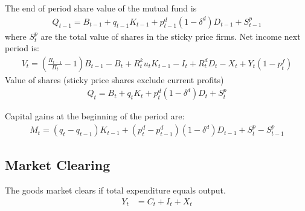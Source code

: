 \documentclass[11pt]{article}
\begin{document}
The end of period share value of the mutual fund is
\begin{align*}
	Q_{t-1} = B_{t-1} + q_{t-1} K_{t-1} + p_{t-1}^d (1 - \delta^d) D_{t-1} + S_{t-1}^p
\end{align*}
where $S_t^p$ are the total value of shares in the sticky price firms. 
Net income next period is:
\begin{align*}
	V_t = \left(\frac{R_{t-1}}{\Pi_t}-1\right) B_{t-1} - B_t + R_t^k u_t K_{t-1} - I_{t} + R_t^d  D_t - X_t + Y_t(1-p_t^f)
\end{align*}
Value of shares (sticky price shares exclude current profits)
\begin{align*}
	Q_{t} = B_{t} + q_{t} K_{t} + p_{t}^d (1 - \delta^d) D_{t} + S_{t}^p
\end{align*}




Capital gains at the beginning of the period are:
\begin{align*}
	M_{t} = (q_{t} - q_{t-1}) K_{t-1} +(p_t^d - p_{t-1}^d) (1 - \delta^d) D_{t-1} + S_{t}^p - S_{t-1}^p
\end{align*}



\subsection{Market Clearing}

The goods market clears if total expenditure equals output.
\begin{align*}
	Y_t &= C_t + I_t + X_t
\end{align*}
\end{document}
